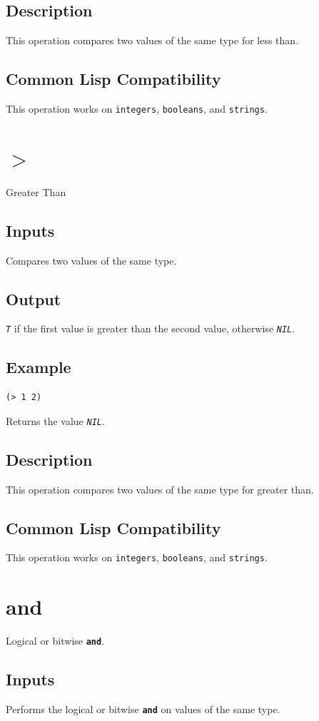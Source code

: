 \documentclass[10pt, openany]{book}
\newcommand{\operation}[1]{\textbf{\texttt{#1}}}
\newcommand{\constant}[1]{\emph{\texttt{#1}}}
\newcommand{\datatype}[1]{\texttt{#1}}
\begin{document}
\subsection{Description}
This operation compares two values of the same type for less than.
\subsection{Common Lisp Compatibility}
This operation works on \datatype{integers}, \datatype{booleans}, and \datatype{strings}.

\section{$>$}
Greater Than
\subsection{Inputs}
Compares two values of the same type.
\subsection{Output}
\constant{T} if the first value is greater than the second value, otherwise \constant{NIL}.
\subsection{Example}
\begin{lstlisting}
(> 1 2)
\end{lstlisting}
Returns the value \constant{NIL}.
\subsection{Description}
This operation compares two values of the same type for greater than.
\subsection{Common Lisp Compatibility}
This operation works on \datatype{integers}, \datatype{booleans}, and \datatype{strings}.

\section{and}
Logical or bitwise \operation{and}.
\subsection{Inputs}
Performs the logical or bitwise \operation{and} on values of the same type.
\end{document}
